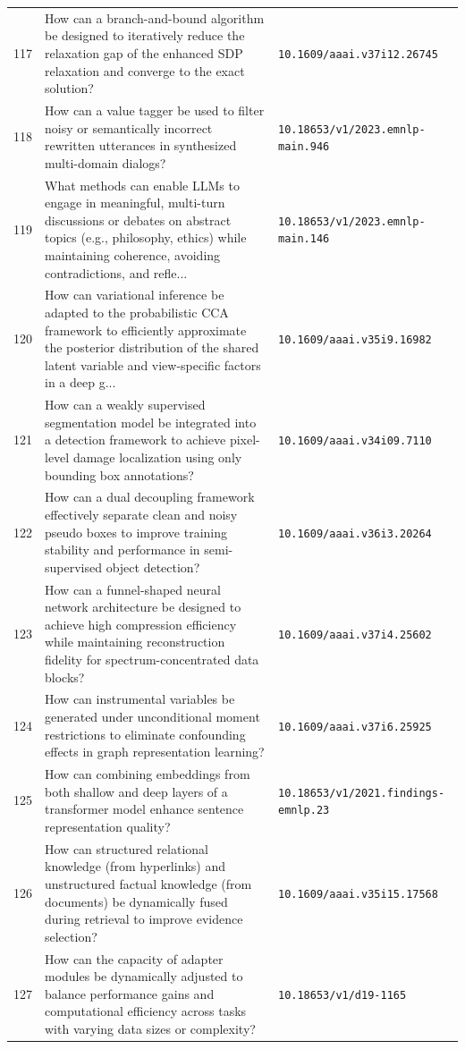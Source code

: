 \documentclass[runningheads]{llncs}
\begin{document}
\begin{longtable}{@{}p{0.5cm}p{7.2cm}p{2.5cm}@{}}
117 & How can a branch-and-bound algorithm be designed to iteratively reduce the relaxation gap of the enhanced SDP relaxation and converge to the exact solution? & \texttt{10.1609/aaai.v37i12.26745} \\
118 & How can a value tagger be used to filter noisy or semantically incorrect rewritten utterances in synthesized multi-domain dialogs? & \texttt{10.18653/v1/2023.emnlp-main.946} \\
119 & What methods can enable LLMs to engage in meaningful, multi-turn discussions or debates on abstract topics (e.g., philosophy, ethics) while maintaining coherence, avoiding contradictions, and refle... & \texttt{10.18653/v1/2023.emnlp-main.146} \\
120 & How can variational inference be adapted to the probabilistic CCA framework to efficiently approximate the posterior distribution of the shared latent variable and view-specific factors in a deep g... & \texttt{10.1609/aaai.v35i9.16982} \\
121 & How can a weakly supervised segmentation model be integrated into a detection framework to achieve pixel-level damage localization using only bounding box annotations? & \texttt{10.1609/aaai.v34i09.7110} \\
122 & How can a dual decoupling framework effectively separate clean and noisy pseudo boxes to improve training stability and performance in semi-supervised object detection? & \texttt{10.1609/aaai.v36i3.20264} \\
123 & How can a funnel-shaped neural network architecture be designed to achieve high compression efficiency while maintaining reconstruction fidelity for spectrum-concentrated data blocks? & \texttt{10.1609/aaai.v37i4.25602} \\
124 & How can instrumental variables be generated under unconditional moment restrictions to eliminate confounding effects in graph representation learning? & \texttt{10.1609/aaai.v37i6.25925} \\
125 & How can combining embeddings from both shallow and deep layers of a transformer model enhance sentence representation quality? & \texttt{10.18653/v1/2021.findings-emnlp.23} \\
126 & How can structured relational knowledge (from hyperlinks) and unstructured factual knowledge (from documents) be dynamically fused during retrieval to improve evidence selection? & \texttt{10.1609/aaai.v35i15.17568} \\
127 & How can the capacity of adapter modules be dynamically adjusted to balance performance gains and computational efficiency across tasks with varying data sizes or complexity? & \texttt{10.18653/v1/d19-1165} \\

\end{longtable}
\end{document}
